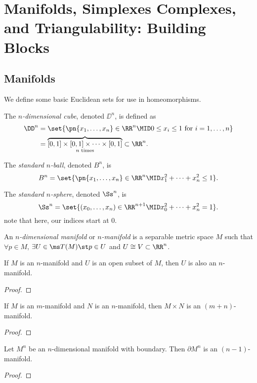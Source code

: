 \chapter[Homological Prereqs]{Manifolds, Simplexes Complexes, and Triangulability: Building Blocks}

\section{Manifolds}
We define some basic Euclidean sets for use in homeomorphisms.
\begin{definition}
  The \emph{$n$-dimensional cube}, denoted $\DD^n$, is defined as
  \begin{align*}
    \DD^n
    &= \set{\pn{x_1, \ldots, x_n} \in \RR^n \MID 0 \leq x_i \leq 1 \text{ for } i = 1, \ldots, n} \\
    &= \overbrace{[0,1] \times [0,1] \times \cdots \times [0,1]}_{n \text{ times}} \subset \RR^n.
  \end{align*}
\end{definition}
\begin{definition}
  The \emph{standard $n$-ball}, denoted $B^n$, is
  \[
    B^n = \set{\pn{x_1, \ldots, x_n} \in \RR^n \MID x_1^2 + \cdots + x^2_n \leq
      1}.
  \]
\end{definition}
\begin{definition}
  The \emph{standard $n$-sphere}, denoted $\Ss^n$, is
  \[
    \Ss^n = \set{(x_0, \ldots, x_n) \in \RR^{n+1} \MID x^2_0 + \cdots + x^2_n =
      1}.
  \]
  note that here, our indices start at $0$.
\end{definition}
\begin{definition}
  An \emph{$n$-dimensional manifold} or \emph{$n$-manifold} is a separable
  metric space $M$ such that $\forall p \in M$, $\exists U \in \ms T(M) \st p
  \in U$ and $U \cong V \subset \RR^n$.
\end{definition}
\begin{problem}[15.8]
  If $M$ is an $n$-manifold and $U$ is an open subset of $M$, then $U$ is also
  an $n$-manifold.
\end{problem}
\begin{proof}

\end{proof}
\begin{problem}[15.9]
  If $M$ is an $m$-manifold and $N$ is an $n$-manifold, then $M \times N$ is an
  $(m+n)$-manifold.
\end{problem}
\begin{proof}

\end{proof}
\begin{problem}[15.10]
  Let $M^n$ be an $n$-dimensional manifold with boundary. Then $\partial M^n$ is
  an $(n-1)$-manifold.
\end{problem}
\begin{proof}

\end{proof}
